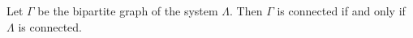 Let $\Gamma$ be the bipartite graph of the system $\Lambda$. Then $\Gamma$ is connected if and only if $\Lambda$ is connected.
